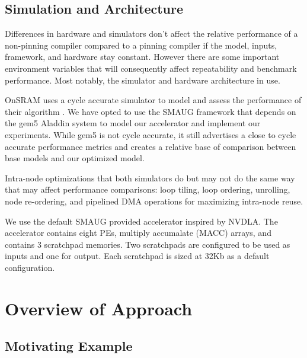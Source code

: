 \subsection{Simulation and Architecture}

Differences in hardware and simulators don't affect the relative performance of
a non-pinning compiler compared to a pinning compiler if the model, inputs,
framework, and hardware stay constant. However there are some important
environment variables that will consequently affect repeatability and benchmark
performance. Most notably, the simulator and hardware architecture in use.

OnSRAM uses a cycle accurate simulator to model and assess the performance of
their algorithm \cite{onsram}.  We have opted to use the SMAUG\cite{smaug}
framework that depends on the gem5 Aladdin\cite{aladdin} system to model our
accelerator and implement our experiments.
While gem5 is not cycle accurate, it still advertises a close to cycle accurate
performance metrics and creates a relative base of comparison between base
models and our optimized model.


Intra-node optimizations that both simulators do but may not do the same way
that may affect performance comparisons: loop tiling, loop ordering, unrolling,
node re-ordering, and pipelined DMA operations for maximizing intra-node reuse.

We use the default SMAUG provided accelerator inspired by NVDLA\cite{smaug}.
The accelerator contains eight PEs, multiply accumalate (MACC) arrays, and
contains 3 scratchpad memories\cite{smaug}. Two scratchpads are configured to
be used as inputs and one for output. Each scratchpad is sized at 32Kb as a default
configuration.




\section{Overview of Approach}
\subsection{Motivating Example}

